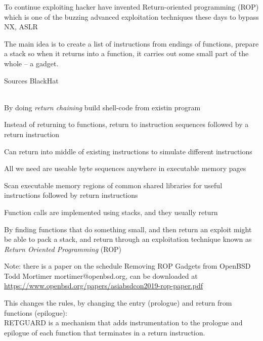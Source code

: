 \documentclass[Screen16to9,17pt]{foils}
\begin{document}

To continue exploiting hacker have invented Return-oriented programming (ROP)
which is one of the buzzing advanced exploitation techniques these days to bypass NX, ASLR

The main idea is to create a list of instructions from endings of functions, prepare a stack so when it returns into a function, it carries out some small part of the whole -- a gadget.

Sources BlackHat\\
\\
{\footnotesize{}}



\begin{list2}
\item By doing \emph{return chaining} build shell-code from existin program
\item Instead of returning to
functions, return to
instruction sequences
followed by a return
instruction

\item Can return into middle of
existing instructions to
simulate different
instructions

\item All we need are useable
byte sequences anywhere
in executable memory
pages
\item Scan executable memory regions of common shared
libraries for useful instructions followed by return
instructions
\end{list2}

{\footnotesize{}}






\begin{list2}
\item Function calls are implemented using stacks, and they usually return
\item By finding functions that do something small, and then return an exploit might be able to pack a stack, and return through an exploitation technique known as \emph{Return Oriented Programming} (ROP)
\item Note: there is a paper on the schedule Removing ROP Gadgets from OpenBSD Todd Mortimer mortimer@openbsd.org, can be downloaded at\\ \url{https://www.openbsd.org/papers/asiabsdcon2019-rop-paper.pdf}
\item This changes the rules, by changing the entry (prologue) and return from functions (epilogue):\\
RETGUARD is a mechanism that adds instrumentation to the
prologue and epilogue of each function that terminates in a
return instruction.
\end{list2}
\end{document}
